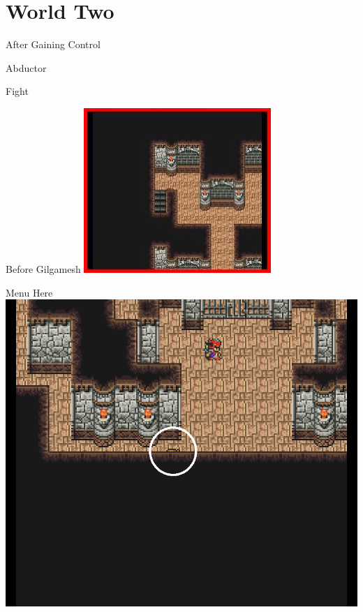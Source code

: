 \chapter{World Two}

\vspace{\baselineskip}

\begin{paracol}{2}

\begin{menu}{After Gaining Control}
    \varwb
    \begin{itemMenu}
        \item \cottage
    \end{itemMenu}
    \varwe
\end{menu}

\begin{boss}{Abductor}
	\varwb
	\begin{round}{1}
		\bartz Fight \then {}
    \end{round}
	\varwe
\end{boss}

\switchcolumn
\begin{steproute}{Before Gilgamesh}
    \includegraphics[scale=0.448]{../Graphics/Steps/89. Gilgamesh Enc.jpg}
\end{steproute}

\begin{misc}{Menu Here}
    \includegraphics[scale=0.157]{../Graphics/Misc/12. Gilgamesh Menu.png}
\end{misc}


\end{paracol}
